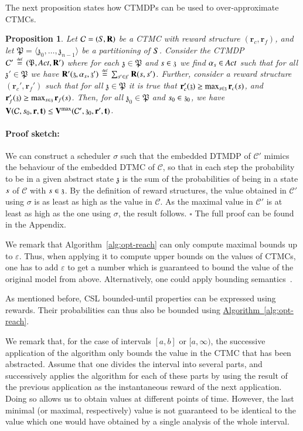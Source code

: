 \documentclass[10pt,twocolumn]{article}
\newenvironment{proofsketch}{\paragraph{Proof sketch:}}{\hfill$\square$}
\newcommand{\states} {{\ensuremath S}}
\newcommand{\state}  {{\ensuremath s}}
\newcommand{\sched}  {{\ensuremath {\sigma}}}
\newcommand{\acts}{\mathit{Act}}
\newcommand{\rmat}{\mathbf{R}}
\newcommand{\cmodel}{\mathcal{C}}
\newcommand{\act}{\alpha}
\newtheorem{proposition}{Proposition}
\newcommand{\rew}{\mathbf{r}}
\newcommand{\frew}{\mathbf{r}_f}
\newcommand{\crew}{\mathbf{r}_c}
\newcommand{\timeb}{\mathbf{t}}
\newcommand{\mvalue}{\mathbf{V}}
\newcommand{\precision}{\varepsilon}
\newcommand{\apart}{\mathfrak{P}}
\newcommand{\astate}{\mathfrak{z}}
\newcommand{\refalg}[1]{\texorpdfstring{\hyperref[alg:#1]{Algorithm~\ref*{alg:#1}}}{Algorithm~\ref*{alg:#1}}}
\newcommand{\defeq}{\,\stackrel{\mbox{\rm {\tiny def}}}{=}\,}
\begin{document}
The next proposition states how CTMDPs can be used to over-approximate
CTMCs.
\begin{proposition}
  \label{pro:corr-abs}
Let $\cmodel = (\states, \rmat)$ be a CTMC with reward structure
  $(\crew, \frew)$, and let $\apart = \langle\astate_0,\ldots,\astate_{n-1}\rangle$ be a partitioning
  of $\states$. Consider the CTMDP $\cmodel' \defeq (\apart, \acts, \rmat')$
  where for each $\astate \in \apart$ and $\state \in \astate$
  we find $\act_\state \in \acts$ such that for all $\astate' \in
  \apart$ we have
  $\rmat'(\astate,\act_\state,\astate') \defeq \sum_{\state' \in \astate'} \rmat(\state, \state')$.
  Further, consider a reward
  structure $(\crew', \frew')$ such that for all $\astate \in \apart$
  it is true that $\crew'(\astate) \geq \max_{\state \in \astate}
  \crew(\state)$, and $\frew'(\astate) \geq \max_{\state \in
    \astate} \frew(\state)$. Then, for all $\astate_0 \in \apart$
  and $\state_0 \in \astate_0$, we have $\mvalue(\cmodel, \state_0,
  \rew, \timeb) \leq \mvalue^{\max}(\cmodel', \astate_0, \rew',
  \timeb)$.
\end{proposition}
\begin{proofsketch}
  We can construct a scheduler $\sched$ such that the embedded DTMDP
  of $\cmodel'$ mimics the behaviour of the embedded DTMC of
  $\cmodel$, so that in each step the probability to be in a given
  abstract state $\astate$ is the sum of the probabilities of being in
  a state $\state$ of $\cmodel$ with $\state \in \astate$.
  By the definition of reward structures, the value obtained in
  $\cmodel'$ using $\sched$ is as least as high as the value in
  $\cmodel$.
  As the maximal value in $\cmodel'$ is at least as high as the one
  using $\sched$, the result follows.
\end{proofsketch}
The full proof can be found in the Appendix.

We remark that Algorithm~\ref{alg:opt-reach} can only compute maximal bounds up to $\precision$.
Thus, when applying it to compute upper bounds on the values of CTMCs, one has to add $\precision$ 
to get a number which is guaranteed to bound the value of the original model from above.
Alternatively, one could apply bounding semantics~\cite{ZhaoC13}.

As mentioned before, CSL bounded-until properties can be expressed
using rewards. Their probabilities can thus also be bounded using
\refalg{opt-reach}.

We remark that, for the case of intervals $[a,b]$ or $[a,\infty)$,
the successive application of the algorithm only bounds the value
in the CTMC that has been abstracted. Assume that one divides the
interval into several parts, and successively applies the algorithm
for each of these parts by using the result of the previous application
as the instantaneous reward of the next application. Doing so allows
us to obtain values at different points of time. However, the last minimal
(or maximal, respectively) value is not guaranteed to be identical to
the value which one would have obtained by a single analysis of the
whole interval.
\end{document}
